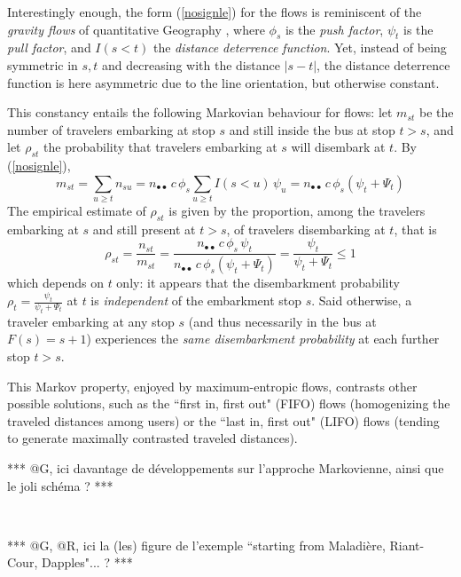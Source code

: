 \documentclass{bmcart}
\begin{document}
Interestingly enough, the form (\ref{nosignle}) for the flows is reminiscent of the {\em gravity flows} of quantitative Geography \cite{wilson1967statistical}  \cite{erlander1990gravity} \cite{bavaud2002quasi} \cite{Thomas-Agnan2021}, where 
$\phi_s$ is the {\em push factor}, $\psi_t$ is the {\em pull factor}, and $I(s<t)$ the {\em distance deterrence function}. Yet, instead of  
being symmetric in $s,t$ and decreasing with the distance $|s-t|$, the distance deterrence function is here asymmetric due to the line orientation, but otherwise constant. 

This constancy entails the following Markovian behaviour for flows: let $m_{st}$ be the number of travelers embarking at stop $s$ and still inside the bus at stop $t>s$, and let $\rho_{st}$ the probability that travelers embarking at $s$ will disembark at $t$. By (\ref{nosignle}), 
\begin{displaymath}
m_{st}=\sum_{u\ge t}n_{su}=n_{\bullet\bullet}\, c\, \phi_s  \sum_{u\ge t} I(s<u)\, \psi_u =n_{\bullet\bullet}\, c\,  \phi_s (\psi_t+\Psi_t) 
\end{displaymath}
The empirical estimate of $\rho_{st}$ is given by the proportion, among the travelers embarking at $s$ and 
 still present at $t>s$,  of travelers disembarking at $t$, that is 
\begin{displaymath}
\rho_{st}=\frac{n_{st}}{m_{st}}=\frac{n_{\bullet\bullet}\, c\,  \phi_s\,   \psi_t}{n_{\bullet\bullet}\, c\,  \phi_s (\psi_t+\Psi_t)}=\frac{\psi_t}{\psi_t+\Psi_t}\le 1 
\end{displaymath}
which depends on $t$ only: it appears that the disembarkment probability $\rho_t=\frac{\psi_t}{\psi_t+\Psi_t}$ at $t$ is {\em independent} of the embarkment stop $s$. Said otherwise, a traveler embarking at any stop $s$ (and thus necessarily in the bus at $F(s)=s+1$) experiences the {\em same disembarkment probability} at each further stop $t>s$. 


This Markov property, enjoyed by maximum-entropic flows, contrasts other possible solutions, such as  the ``first in, first out" (FIFO) flows (homogenizing the 
traveled distances among users) or the ``last in, first out" (LIFO) flows (tending to generate maximally  contrasted traveled distances).


***  @G, ici davantage de développements sur l'approche Markovienne, ainsi que le joli schéma ?  ***


\

*** @G, @R, ici la (les) figure de l'exemple  ``starting from Maladière, Riant-Cour, Dapples"... ? ***
\end{document}
